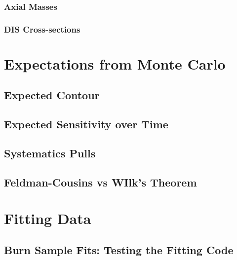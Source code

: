 \label{subsubsec:axial_masses}
\subsubsection{Axial Masses}

\label{subsubsec:dis_systematics}
\subsubsection{DIS Cross-sections}

\label{subsec:detector_systematics}


\label{sec:likelihood}


\label{sec:tau_parametrization}


\label{sec:mc_expectation}
\section{Expectations from Monte Carlo}

\label{subsec:sensitivity}
\subsection{Expected Contour}

\label{subsec:sensitivity_vs_time}
\subsection{Expected Sensitivity over Time}

\label{subsec:systematic_pulls}
\subsection{Systematics Pulls}

\label{subsec:wilks}
\subsection{Feldman-Cousins vs WIlk's Theorem}

\label{sec:fitting_data}
\section{Fitting Data}

\label{subsec:burn_sample}
\subsection{Burn Sample Fits: Testing the Fitting Code}

